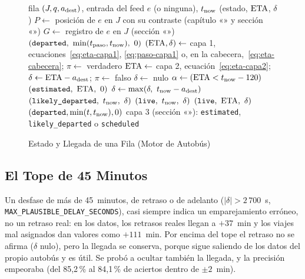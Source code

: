 \begin{figure}[ht]
\caption{Estado y Llegada de una Fila (Motor de Autobús)}\label{alg:fila}
\begin{algorithmic}[1]
\Require fila $(J,q,a_{\mathrm{dest}})$, entrada del feed $e$ (o ninguna), $t_{\mathrm{now}}$
\Ensure (estado, $\mathrm{ETA}$, $\delta$)
\State $P\gets$ posición de $e$ en $J$ con su contraste (capítulo «» y sección «»)
\State $G\gets$ registro de $e$ en $J$ (sección «»)
  \State \Return {}
\EndIf
{}
  \State \Return $(\texttt{departed},\ \min(t_{\mathrm{paso}},\tnow),\ 0)$
\EndIf
{}
  \State \Return {}
\EndIf
{}
  \State $(\mathrm{ETA},\delta)\gets$ capa 1, ecuaciones~\eqref{eq:eta-capa1}, \eqref{eq:paso-capa1} o, en la cabecera,~\eqref{eq:eta-cabecera}; $\pi\gets$ verdadero
\Else
  \State $\mathrm{ETA}\gets$ capa 2, ecuación~\eqref{eq:eta-capa2}; $\delta\gets\mathrm{ETA}-a_{\mathrm{dest}}$; $\pi\gets$ falso
\EndIf
{} $\delta\gets$ nulo \EndIf {}
\State $\alpha\gets(\mathrm{ETA}<t_{\mathrm{now}}-120)$ 
 \State \Return {} \EndIf
{} \State \Return $(\texttt{estimated},\ \mathrm{ETA},\ 0)$ \EndIf
\If{$\ETA<\tnow$} 
   $\delta\gets\max(\delta,\ t_{\mathrm{now}}-a_{\mathrm{dest}})$ \EndIf
   \State \Return $(\texttt{likely\_departed},\ \tnow,\ \delta)$ \EndIf
  \State \Return $(\texttt{live},\ \tnow,\ \delta)$
\EndIf
\State \Return $(\texttt{live},\ \ETA,\ \delta)$
\Statex
{}
   \State \Return $(\texttt{departed},\min(t,t_{\mathrm{now}}),0)$ \EndIf
  \State \Return capa 3 (sección «»): \texttt{estimated}, \texttt{likely\_departed} o \texttt{scheduled}
\EndFunction
\end{algorithmic}
\end{figure}

\subsection{El Tope de 45 Minutos} Un desfase de más de 45~minutos, de retraso o de adelanto ($|\delta|>2\,700$~s,
\texttt{MAX\_PLAUSIBLE\_DELAY\_SECONDS}), casi siempre indica un emparejamiento erróneo, no un retraso real: en los datos, los retrasos reales llegan a $+37$~min y
los viajes mal asignados dan valores como $+111$~min. Por encima del tope el retraso no se afirma ($\delta$ nulo), pero
la llegada se conserva, porque sigue saliendo de los datos del propio autobús y es útil. Se probó a ocultar también
la llegada, y la precisión empeoraba (del 85,2\,\% al 84,1\,\% de aciertos dentro de $\pm2$~min).

